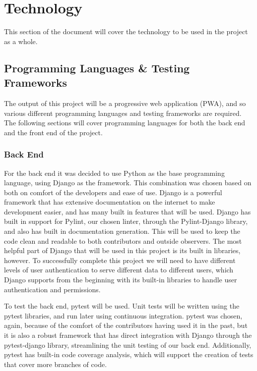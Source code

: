 \documentclass{article}
\begin{document}
\section{Technology}

This section of the document will cover the technology to be used in the project as a whole.

\subsection{Programming Languages \& Testing Frameworks}

The output of this project will be a progressive web application (PWA), and so various different programming languages and testing frameworks are required. The following sections will cover programming languages for both the back end and the front end of the project.

\subsubsection{Back End}

For the back end it was decided to use Python as the base programming language, using Django as the framework. This combination was chosen based on both on comfort of the developers and ease of use. Django is a powerful framework that has extensive documentation on the internet to make development easier, and has many built in features that will be used. Django has built in support for Pylint, our chosen linter, through the Pylint-Django library, and also has built in documentation generation. This will be used to keep the code clean and readable to both contributors and outside observers. The most helpful part of Django that will be used in this project is its built in libraries, however. To successfully complete this project we will need to have different levels of user authentication to serve different data to different users, which Django supports from the beginning with its built-in libraries to handle user authentication and permissions.

To test the back end, pytest will be used. Unit tests will be written using the pytest libraries, and run later using continuous integration. pytest was chosen, again, because of the comfort of the contributors having used it in the past, but it is also a robust framework that has direct integration with Django through the pytest-django library, streamlining the unit testing of our back end. Additionally, pytest has built-in code coverage analysis, which will support the creation of tests that cover more branches of code.
\end{document}
